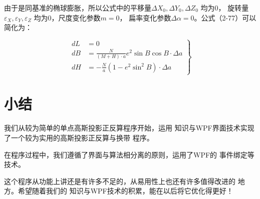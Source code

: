 由于是同基准的椭球膨胀，所以公式中的平移量$\Delta X_0, \Delta Y_0, \Delta Z_0$ 均为0，
旋转量$\varepsilon_X, \varepsilon_Y, \varepsilon_Z$ 均为0，尺度变化参数$m=0$， 扁率变化参数$\Delta \alpha=0$。公式（2-77）可以简化为：


$$
\left .
\begin{aligned}
dL &= 0 \\
dB &= \frac{N}{(M+H) \cdot a} e^2 \sin B \cos B \cdot \Delta a  \\
dH &= -\frac{N}{a}(1-e^2 \sin ^2 B ) \cdot \Delta a
\end{aligned} 
\right \}
$$


\section*{小结}

我们从较为简单的单点高斯投影正反算程序开始，运用
 \cs 知识与WPF界面技术实现了一个较为实用的高斯投影正反算与换带
程序。

在程序过程中，我们遵循了界面与算法相分离的原则，运用了WPF的
事件绑定等技术。

这个程序从功能上讲还是有许多不足的，从易用性上也还有许多值得改进的
地方。希望随着我们的 \cs 知识与WPF技术的积累，能在以后将它优化得更好！


